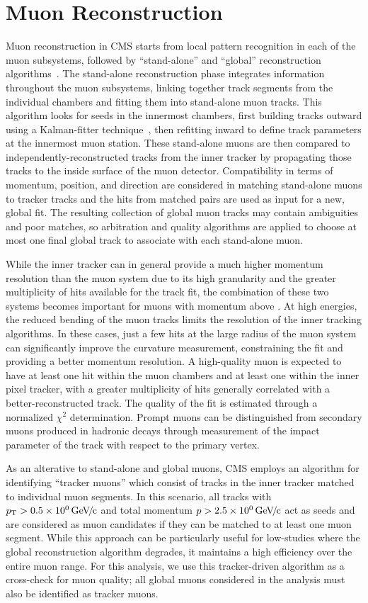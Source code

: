 \section{Muon Reconstruction}
Muon reconstruction in CMS starts from local pattern recognition in each of the muon subsystems, followed by ``stand-alone'' and ``global'' reconstruction algorithms~\cite{CMS-MuonReco}.  The stand-alone reconstruction phase integrates information throughout the muon subsystems, linking together track segments from the individual chambers and fitting them into stand-alone muon tracks.  This algorithm looks for seeds in the innermost chambers, first building tracks outward using a Kalman-fitter technique~\cite{Fruhwirth1987444}, then refitting inward to define track parameters at the innermost muon station.  These stand-alone muons are then compared to independently-reconstructed tracks from the inner tracker by propagating those tracks to the inside surface of the muon detector.  Compatibility in terms of momentum, position, and direction are considered in matching stand-alone muons to tracker tracks and the hits from matched pairs are used as input for a new, global fit.  The resulting collection of global muon tracks may contain ambiguities and poor matches, so arbitration and quality algorithms are applied to choose at most one final global track to associate with each stand-alone muon.

While the inner tracker can in general provide a much higher momentum resolution than the muon system due to its high granularity and the greater multiplicity of hits available for the track fit, the combination of these two systems becomes important for muons with momentum above .  At high energies, the reduced bending of the muon tracks limits the resolution of the inner tracking algorithms.  In these cases, just a few hits at the large radius of the muon system can significantly improve the curvature measurement, constraining the fit and providing a better momentum resolution.  A high-quality muon is expected to have at least one hit within the muon chambers and at least one within the inner pixel tracker, with a greater multiplicity of hits generally correlated with a better-reconstructed track.  The quality of the fit is estimated through a normalized $\chi^2$ determination.  Prompt muons can be distinguished from secondary muons produced in hadronic decays through measurement of the impact parameter of the track with respect to the primary vertex.

As an alterative to stand-alone and global muons, CMS employs an algorithm for identifying ``tracker muons'' which consist of tracks in the inner tracker matched to individual muon segments.  In this scenario, all tracks with $p_{\mathrm{T}} > \SI{0.5}{\ensuremath{{\text{Ge\hspace{-.08em}V\hspace{-0.16em}/\hspace{-0.08em}c}}}}$ and total momentum $p > \SI{2.5}{\ensuremath{{\text{Ge\hspace{-.08em}V\hspace{-0.16em}/\hspace{-0.08em}c}}}}$ act as seeds and are considered as muon candidates if they can be matched to at least one muon segment.  While this approach can be particularly useful for low-\pt studies where the global reconstruction algorithm degrades, it maintains a high efficiency over the entire muon \pt range.  For this analysis, we use this tracker-driven algorithm as a cross-check for muon quality; all global muons considered in the analysis must also be identified as tracker muons.

